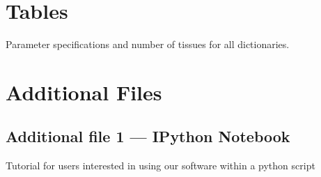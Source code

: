 \documentclass[linenumbers, doublespacing]{bmcart}
\begin{document}
\begin{backmatter}

\section*{Tables}
\begin{table}[h!]
\caption{Parameter specifications and number of tissues for all dictionaries.}
	\label{tab:DictionarySpecs}
\end{table}


\section*{Additional Files}
  \subsection*{Additional file 1 --- IPython Notebook}
    Tutorial for users interested in using our software within a python script


\end{backmatter}
\end{document}

